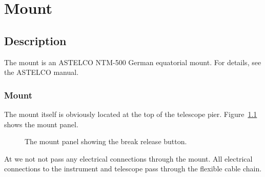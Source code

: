 \chapter{Mount}
\label{chapter:mount}

\section{Description}

The mount is an ASTELCO NTM-500 German equatorial mount. For details, see the ASTELCO manual. 

\subsection{Mount}

The mount itself is obviously located at the top of the telescope pier.
Figure~\ref{figure:mount-panel} shows the mount panel.

\begin{figure}
\begin{center}
\end{center}
\caption{The mount panel showing the break release button.}
\label{figure:mount-panel}
\end{figure}

\ifcoatlioan
At {\projectname} we not not pass any electrical connections through the mount. All electrical connections to the instrument and telescope pass through the flexible cable chain.
\fi


